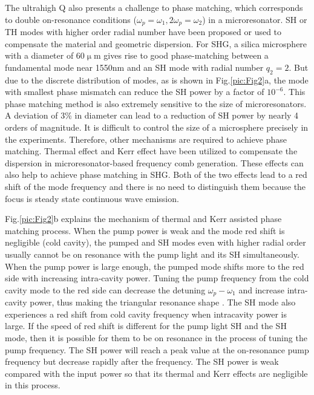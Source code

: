 \documentclass[a4paper,8pt,hyperref, twocolumn]{article}
\begin{document}
The ultrahigh Q also presents a challenge to phase matching, which corresponds to double on-resonance conditions ($\omega_p = \omega_1, 2\omega_p = \omega_2$) in a microresonator\cite{carmon2007visible, kozyreff2008whispering, xu2008second, farnesi2014optical}. SH or TH modes with higher order radial number have been proposed or used to compensate the material and geometric dispersion\cite{carmon2007visible, kozyreff2008whispering, farnesi2014optical}. For SHG, a silica microsphere with a diameter of 60$\upmu$m gives rise to good phase-matching between a fundamental mode near 1550nm and an SH mode with radial number $q_2=2$. But due to the discrete distribution of modes, as is shown in Fig.\ref{pic:Fig2}a, the mode with smallest phase mismatch can reduce the SH power by a factor of $10^{-6}$. This phase matching method is also extremely sensitive to the size of microresonators. A deviation of 3\% in diameter can lead to a reduction of SH power by nearly 4 orders of magnitude. It is difficult to control the size of a microsphere precisely in the experiments. Therefore, other mechanisms are required to achieve phase matching. Thermal effect and Kerr effect have been utilized to compensate the dispersion in microresonator-based frequency comb generation\cite{del2011octave, herr2014temporal}. These effects can also help to achieve phase matching in SHG. Both of the two effects lead to a red shift of the mode frequency \cite{ilchenko1992thermal, treussart1998evidence,  carmon2004dynamical, fomin2005nonstationary} and there is no need to distinguish them because the focus is steady state continuous wave emission. 

Fig.\ref{pic:Fig2}b explains the mechanism of thermal and Kerr assisted phase matching process. When the pump power is weak and the mode red shift is negligible (cold cavity), the pumped and SH modes even with higher radial order usually cannot be on resonance with the pump light and its SH simultaneously. When the pump power is large enough, the pumped mode shifts more to the red side with increasing intra-cavity power. Tuning the pump frequency from the cold cavity mode to the red side can decrease the detuning $\omega_p-\omega_1$ and increase intra-cavity power, thus making the triangular resonance shape \cite{carmon2004dynamical}. The SH mode also experiences a red shift from cold cavity frequency when intracavity power is large. If the speed of red shift is different for the pump light SH and the SH mode, then it is possible for them to be on resonance in the process of tuning the pump frequency. The SH power will reach a peak value at the on-resonance pump frequency but decrease rapidly after the frequency. The SH power is weak compared with the input power so that its thermal and Kerr effects are negligible in this process.
\end{document}

